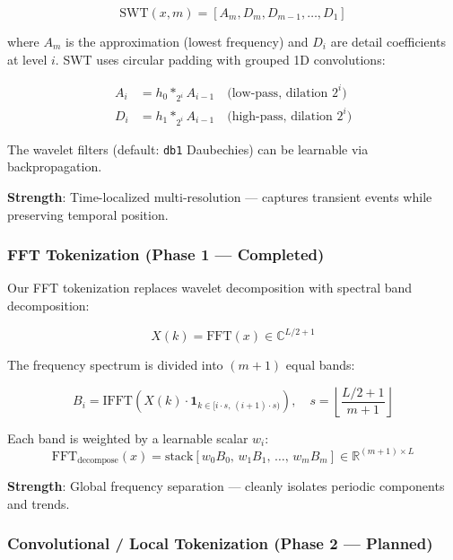 \documentclass[12pt,a4paper]{article}
\begin{document}
\begin{equation}
  \text{SWT}(x, m) = [A_m, D_m, D_{m-1}, \ldots, D_1]
\end{equation}

where $A_m$ is the approximation (lowest frequency) and $D_i$ are detail coefficients at level $i$. SWT uses circular padding with grouped 1D convolutions:

\begin{align}
  A_i &= h_0 *_{2^i} A_{i-1} \quad \text{(low-pass, dilation } 2^i\text{)} \\
  D_i &= h_1 *_{2^i} A_{i-1} \quad \text{(high-pass, dilation } 2^i\text{)}
\end{align}

The wavelet filters (default: \texttt{db1} Daubechies) can be learnable via backpropagation.

\textbf{Strength}: Time-localized multi-resolution --- captures transient events while preserving temporal position.

\subsubsection{FFT Tokenization (Phase 1 --- Completed)}

Our FFT tokenization replaces wavelet decomposition with spectral band decomposition:

\begin{equation}
  X(k) = \text{FFT}(x) \in \mathbb{C}^{L/2+1}
\end{equation}

The frequency spectrum is divided into $(m{+}1)$ equal bands:

\begin{equation}
  B_i = \text{IFFT}\left(X(k) \cdot \mathbf{1}_{k \in [i \cdot s, \, (i{+}1) \cdot s)}\right), \quad s = \left\lfloor \frac{L/2 + 1}{m + 1} \right\rfloor
\end{equation}

Each band is weighted by a learnable scalar $w_i$:
\begin{equation}
  \text{FFT}_\text{decompose}(x) = \text{stack}[w_0 B_0, \, w_1 B_1, \, \ldots, \, w_m B_m] \in \mathbb{R}^{(m+1) \times L}
\end{equation}

\textbf{Strength}: Global frequency separation --- cleanly isolates periodic components and trends.

\subsubsection{Convolutional / Local Tokenization (Phase 2 --- Planned)}
\label{sec:conv_token}
\end{document}
